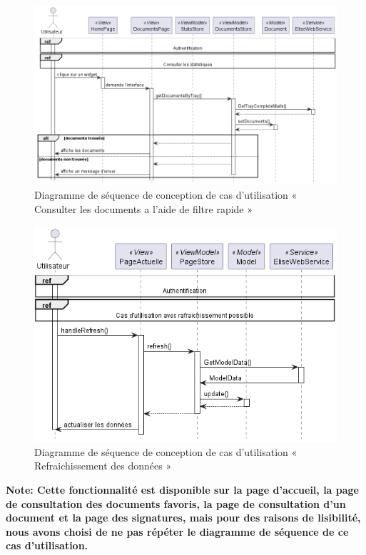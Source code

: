 \begin{figure}[H]
  \centering
  \includegraphics[width=1\textwidth]{out/diagrams/sprint7/sequence_docs_quick_filter/sequence_docs_quick_filter}
  \caption{Diagramme de séquence de conception de cas d'utilisation « Consulter les documents a l'aide de filtre rapide »}
  \label{fig:sequence_conception_consulter_documents_filtre_rapide}
\end{figure}

\begin{figure}[H]
  \centering
  \includegraphics[width=1\textwidth]{out/diagrams/sprint7/sequence_refresh_data/sequence_refresh_data}
  \caption{Diagramme de séquence de conception de cas d'utilisation « Refraichissement des données »}
  \label{fig:sequence_conception_refraichissement_donnees}
\end{figure}
\textbf{Note: Cette fonctionnalité est disponible sur la page d'accueil, la page de consultation des documents favoris, la page de consultation d'un document et la page des signatures, mais pour des raisons de lisibilité, nous avons choisi de ne pas répéter le diagramme de séquence de ce cas d'utilisation.}

